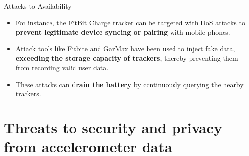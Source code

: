\documentclass[ucs,9pt,usenames,dvipsnames]{beamer}
\begin{document}
\begin{frame}{Attacks to Availability}
	\begin{itemize}
		\item For instance, the FitBit Charge tracker can be targeted with DoS attacks to \textbf{prevent legitimate device syncing or pairing} with mobile phones.
		\item Attack tools like Fitbite and GarMax have been used to inject fake data, \textbf{exceeding the storage capacity of trackers}, thereby preventing them from recording valid user data.
		\item These attacks can \textbf{drain the battery} by continuously querying the nearby trackers. 
	\end{itemize}
\end{frame}



\section{Threats to security and privacy from accelerometer data}
\end{document}
